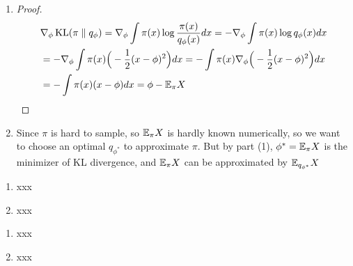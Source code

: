 \documentclass{article}
\DeclareMathOperator{\KL}{\text{KL}}
\begin{document}



\begin{enumerate}
\item 
\begin{proof}
\begin{align*}
& \nabla_{\phi}\KL(\pi \parallel q_{\phi}) = \nabla_{\phi} \int\pi(x) \log \frac{\pi(x)}{q_{\phi}(x)} dx = -\nabla_{\phi} \int \pi(x) \log q_{\phi}(x) dx\\
& = -\nabla_{\phi} \int \pi(x) \Big(-\frac12 (x-\phi)^2\Big) dx = -\int \pi(x) \nabla_{\phi}\Big(-\frac12 (x-\phi)^2\Big) dx\\
& = -\int \pi(x) (x - \phi) dx = \phi - \E_{\pi} X
\end{align*}

\end{proof}
\item 
Since $\pi$ is hard to sample, so $\mathbb{E}_{\pi} X$ is hardly known numerically, so we want to choose an optimal $q_{\phi^*}$ to approximate $\pi$. But by part (1), $\phi^* = \mathbb{E}_{\pi} X$ is the minimizer of KL divergence, and $\mathbb{E}_{\pi} X$ can be approximated by $\mathbb{E}_{q_{\phi^*}} X$
\end{enumerate}
    




\begin{enumerate}
\item 
xxx
\item 
xxx
\end{enumerate}
    



\begin{enumerate}
\item 
xxx
\item 
xxx
\end{enumerate}

 
\end{document}
